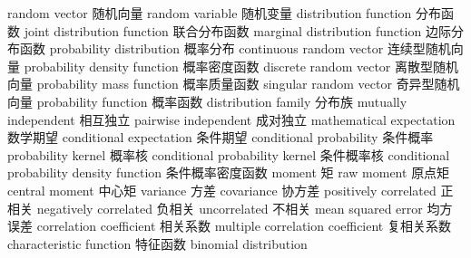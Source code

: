 {random vector} 
{随机向量}
{random variable} 
{随机变量}
{distribution function} 
{分布函数}
{joint distribution function} 
{联合分布函数}
{marginal distribution function} 
{边际分布函数}
{probability distribution} 
{概率分布}
{continuous random vector} 
{连续型随机向量}
{probability density function} 
{概率密度函数}
{discrete random vector} 
{离散型随机向量}
{probability mass function} 
{概率质量函数}
{singular random vector} 
{奇异型随机向量}
{probability function} 
{概率函数}
{distribution family} 
{分布族}
{mutually independent} 
{相互独立}
{pairwise independent} 
{成对独立}
{mathematical expectation} 
{数学期望}
{conditional expectation} 
{条件期望}
{conditional probability} 
{条件概率}
{probability kernel}
{概率核}
{conditional probability kernel}
{条件概率核}
{conditional probability density function}
{条件概率密度函数}
{moment} 
{矩}
{raw moment} 
{原点矩}
{central moment} 
{中心矩}
{variance} 
{方差}
{covariance} 
{协方差}
{positively correlated} 
{正相关}
{negatively correlated} 
{负相关}
{uncorrelated} 
{不相关}
{mean squared error} 
{均方误差}
{correlation coefficient} 
{相关系数}
{multiple correlation coefficient} 
{复相关系数}
{characteristic function} 
{特征函数}
{binomial distribution} 
